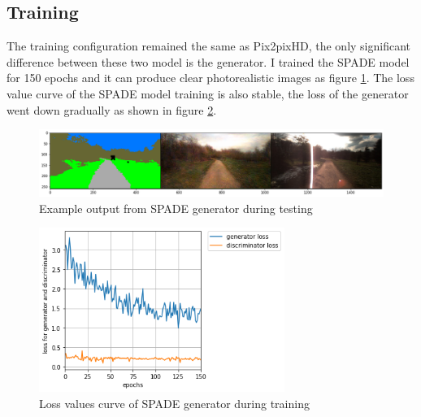 \subsection{Training}
The training configuration remained the same as Pix2pixHD, the only significant difference between 
these two model is the generator. I trained the SPADE model for 150 epochs and it can produce 
clear photorealistic images as figure \ref{fig:SPADE-output}. The loss value curve of 
the SPADE model training is also stable, the loss of the generator went down gradually as shown 
in figure \ref{fig:SPADE-loss}. 
\begin{figure}[H]
    \begin{center}
    \includegraphics[width=14cm]{figures/SPADE-output}
    \end{center}
    \caption{Example output from SPADE generator during testing}
    \label{fig:SPADE-output}
\end{figure}
\begin{figure}[H]
    \begin{center}
    \includegraphics[width=8cm]{figures/SPADE-loss}
    \end{center}
    \caption{Loss values curve of SPADE generator during training}
    \label{fig:SPADE-loss}
\end{figure}
